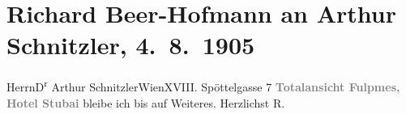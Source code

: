 

         \renewcommand{\erwaehnteOrte}{Orte: Edmund-Weiß-Gasse, Fulpmes, Grand Hotel Stubai, Wien}
         \renewcommand{\erwaehnteWerke}{}
               \section[Richard Beer-Hofmann an Arthur Schnitzler, 4. 8. 1905]{ Richard Beer-Hofmann an Arthur Schnitzler, 4. 8. 1905}\nopagebreak{}\rehead{ }\begin{ledgroupsized}[t]{13cm}\normalsize\beginnumbering \toendnotes[C]{\smallbreak\pagebreak[2]} 
\pstart{}{\pb}Herrn\pend{}\pstart{}D\textsuperscript{r} Arthur Schnitzler\pend{}\pstart{}Wien\pend{}\pstart{}XVIII. Spöttelgasse 7\pend{}{\bigskip}\pstart
           \noindent{}\centering{}{\pb}\textcolor{gray}{\textbf{Totalansicht Fulpmes, Hotel Stubai}}\pend
           \pstart
           \noindent{}bleibe ich bis auf Weiteres. Herzlichst \spacefill\mbox{R.}\pend
           
         
         \endnumbering{}\end{ledgroupsized}  \newcommand{\dateiname}{L01537}\newcommand{\titel}{Richard Beer-Hofmann an Arthur Schnitzler, 4. 8. 1905}\newcommand{\editorInnen}{Martin Anton Müller und Gerd-Hermann Susen}
      